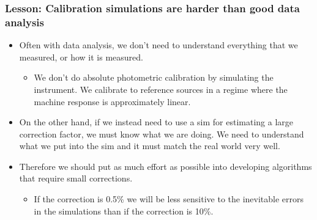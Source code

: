 \documentclass{beamer}
\begin{document}
\frame
{

    \frametitle{Lesson: Calibration simulations are harder than good data analysis}


    \begin{itemize}

        \item Often with data analysis, we don't need to understand everything that
            we measured, or how it is measured.

            \begin{itemize}

                \item We don't do absolute photometric calibration by
                    simulating the instrument.  We calibrate to reference
                    sources in a regime where the machine response is
                    approximately linear.

            \end{itemize}

        \item On the other hand, if we instead need to use a sim for estimating
            a large correction factor, we must know what we are doing. We need
            to understand what we put into the sim and it must match the real
            world very well.

        \item Therefore we should put as much effort as possible into developing
            algorithms that require small corrections.

            \begin{itemize}
    
                \item If the correction is 0.5\% we will be less sensitive to the
                    inevitable errors in the simulations than if the correction is 10\%.

            \end{itemize}

    \end{itemize}

}
\end{document}
